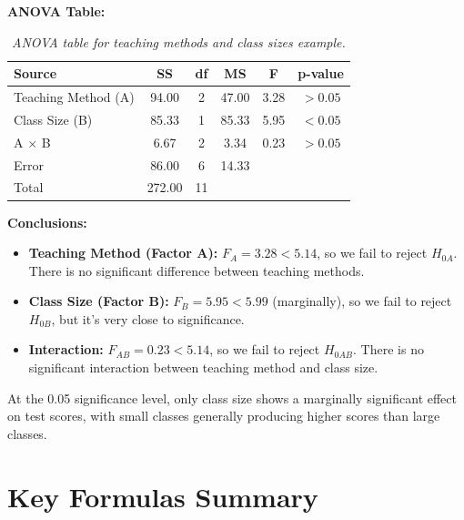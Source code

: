 \documentclass[twoside]{book}
\begin{document}
\textbf{ANOVA Table:}

\begin{table}[H]
\centering
\begin{tabular}{l|c|c|c|c|c}
\toprule
\textbf{Source} & \textbf{SS} & \textbf{df} & \textbf{MS} & \textbf{F} & \textbf{p-value} \\
\midrule
Teaching Method (A) & 94.00 & 2 & 47.00 & 3.28 & $> 0.05$ \\
Class Size (B) & 85.33 & 1 & 85.33 & 5.95 & $< 0.05$ \\
A $\times$ B & 6.67 & 2 & 3.34 & 0.23 & $> 0.05$ \\
Error & 86.00 & 6 & 14.33 & & \\
\midrule
Total & 272.00 & 11 & & & \\
\bottomrule
\end{tabular}
\caption{\textit{ANOVA table for teaching methods and class sizes example.}}
\end{table}

\textbf{Conclusions:}
\begin{itemize}
\item \textbf{Teaching Method (Factor A):} $F_A = 3.28 < 5.14$, so we fail to reject $H_{0A}$. There is no significant difference between teaching methods.
\item \textbf{Class Size (Factor B):} $F_B = 5.95 < 5.99$ (marginally), so we fail to reject $H_{0B}$, but it's very close to significance.
\item \textbf{Interaction:} $F_{AB} = 0.23 < 5.14$, so we fail to reject $H_{0AB}$. There is no significant interaction between teaching method and class size.
\end{itemize}

At the 0.05 significance level, only class size shows a marginally significant effect on test scores, with small classes generally producing higher scores than large classes.


\section{Key Formulas Summary}
\end{document}
